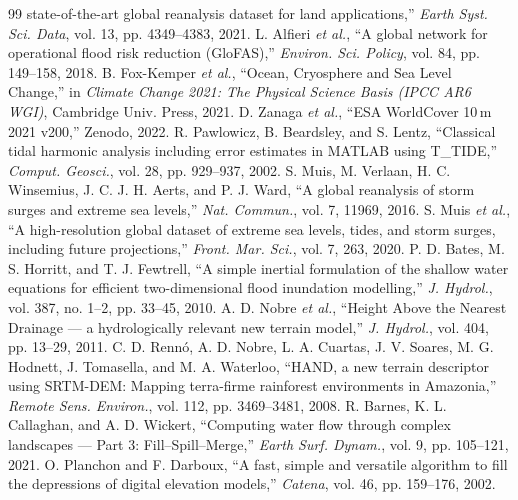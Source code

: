 \documentclass[conference]{IEEEtran}
\begin{document}
\begin{thebibliography}{99}
state-of-the-art global reanalysis dataset for land applications,'' \emph{Earth Syst.
Sci. Data}, vol. 13, pp. 4349--4383, 2021.
 L. Alfieri \emph{et al.}, ``A global network for operational
flood risk reduction (GloFAS),'' \emph{Environ. Sci. Policy}, vol. 84, pp. 149--158,
2018.
 B. Fox-Kemper \emph{et al.}, ``Ocean, Cryosphere and Sea Level
Change,'' in \emph{Climate Change 2021: The Physical Science Basis (IPCC AR6 WGI)},
Cambridge Univ. Press, 2021.
 D. Zanaga \emph{et al.}, ``ESA WorldCover 10\,m 2021 v200,''
Zenodo, 2022.
 R. Pawlowicz, B. Beardsley, and S. Lentz, ``Classical tidal
harmonic analysis including error estimates in MATLAB using T\_TIDE,'' \emph{Comput.
Geosci.}, vol. 28, pp. 929--937, 2002.
 S. Muis, M. Verlaan, H. C. Winsemius, J. C. J. H. Aerts, and
P. J. Ward, ``A global reanalysis of storm surges and extreme sea levels,''
\emph{Nat. Commun.}, vol. 7, 11969, 2016.
 S. Muis \emph{et al.}, ``A high-resolution global dataset of
extreme sea levels, tides, and storm surges, including future projections,''
\emph{Front. Mar. Sci.}, vol. 7, 263, 2020.
 P. D. Bates, M. S. Horritt, and T. J. Fewtrell, ``A simple
inertial formulation of the shallow water equations for efficient two-dimensional
flood inundation modelling,'' \emph{J. Hydrol.}, vol. 387, no. 1--2, pp. 33--45, 2010.
 A. D. Nobre \emph{et al.}, ``Height Above the Nearest Drainage ---
a hydrologically relevant new terrain model,'' \emph{J. Hydrol.}, vol. 404, pp.
13--29, 2011.
 C. D. Rennó, A. D. Nobre, L. A. Cuartas, J. V. Soares,
M. G. Hodnett, J. Tomasella, and M. A. Waterloo, ``HAND, a new terrain descriptor
using SRTM-DEM: Mapping terra-firme rainforest environments in Amazonia,''
\emph{Remote Sens. Environ.}, vol. 112, pp. 3469--3481, 2008.
 R. Barnes, K. L. Callaghan, and A. D. Wickert, ``Computing water
flow through complex landscapes --- Part 3: Fill--Spill--Merge,'' \emph{Earth Surf.
Dynam.}, vol. 9, pp. 105--121, 2021.
 O. Planchon and F. Darboux, ``A fast, simple and versatile
algorithm to fill the depressions of digital elevation models,'' \emph{Catena}, vol.
46, pp. 159--176, 2002.
\end{thebibliography}
\end{document}

